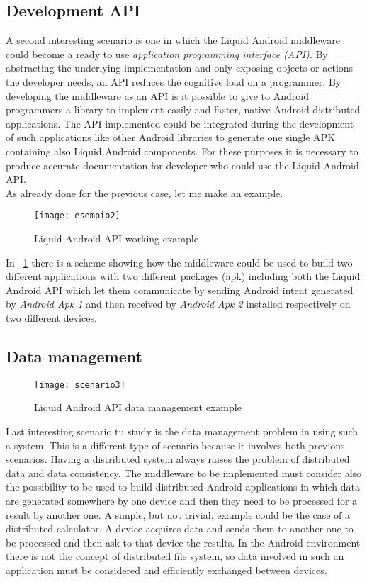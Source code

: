 \subsection{Development API}\label{devAPI} A second interesting scenario is one in which the Liquid Android middleware could become a ready to use \textit{application programming interface (API)}. By abstracting the underlying implementation and only exposing objects or actions the developer needs, an API reduces the cognitive load on a programmer. By developing the middleware as an API is it possible to give to Android programmers a library to implement easily and faster, native Android distributed applications. The API implemented could be integrated during the development of such applications like other Android libraries to generate one single APK containing also Liquid Android components. For these purposes it is necessary to produce accurate documentation for developer who could use the Liquid Android API.\\
As already done for the previous case, let me make an example.
\begin{figure}[h]
	\centering
	\texttt{[image: esempio2]}
	\caption{Liquid Android API working example}
	\label{fig:3.4}
\end{figure}
In \figurename~\ref{fig:3.4} there is a scheme showing how the middleware could be used to build two different applications with two different packages (apk) including both the Liquid Android API which let them communicate by sending Android intent generated by \textit{Android Apk 1} and then received by \textit{Android Apk 2} installed respectively on two different devices.

\subsection{Data management}
\begin{figure}[h]
	\centering
	\texttt{[image: scenario3]}
	\caption{Liquid Android API data management example}
	\label{fig:3.5}
\end{figure}
Last interesting scenario tu study is the data management problem in using such a system. This is a different type of scenario because it involves both previous scenarios. Having a distributed system always raises the problem of distributed data and data consistency. The middleware to be implemented must consider also the possibility to be used to build distributed Android applications in which data are generated somewhere by one device and then they need to be processed for a result by another one. A simple, but not trivial, example could be the case of a distributed calculator. A device acquires data and sends them to another one to be processed and then ask to that device the results. In the Android environment there is not the concept of distributed file system, so data involved in such an application must be considered and efficiently exchanged between devices.



